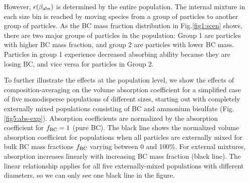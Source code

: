 \documentclass[edeposit,fullpage]{uiucthesis2009}
\begin{document}

However, $\epsilon(\beta_{\rm abs})$ is determined by the entire
population. The internal mixture in each size bin is reached by
moving species from a group of particles to another group of
particles.  As the BC mass fraction distribution  in
Fig.\ref{fig1:scen} shows, there are two major groups of particles in
the population: Group 1 are particles with higher BC mass fraction,
and group 2 are particles with lower BC mass. Particles in group 1
experience decreased absorbing ability because they are losing BC, and
vice versa for particles in Group 2.

To further illustrate the effects at the population level, we show the
effects of composition-averaging on the volume absorption coefficient
for a simplified case of five monodisperse populations of different
sizes, starting out with completely externally mixed populations
consisting of BC and ammonium bisulfate
(Fig.\ref{fig5:abs-exp}). Absorption coefficients are normalized by
the absorption coefficient for $f_{\rm BC} = 1$ (pure BC). The black
line shows the normalized volume absorption coefficient for
populations when all particles are externally mixed for bulk BC mass
fractions $f_{\rm BC}$ varying between 0 and 100\%. For external
mixtures, absorption increases linearly with increasing BC mass
fraction (black line). The linear relationship applies for all five
externally-mixed populations with different diameters, so we can only
see one black line in the figure.
\end{document}
